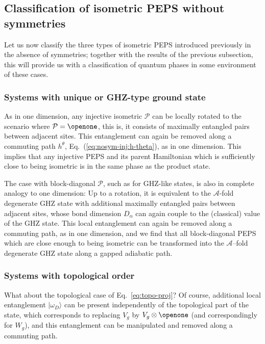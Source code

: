 \documentclass[twocolumn,superscriptaddress,prb,linenumbers]{revtex4-1}
\newcommand{\ket}[1]{\vert#1\rangle}
\newcommand{\mc}[1]{\mathcal{#1}}
\begin{document}
\subsection{Classification of isometric PEPS without symmetries}

Let us now classify the three types of isometric PEPS introduced
previously in the absence of symmetries; together with the results of the
previous subsection, this will provide us with a classification of quantum
phases in some environment of these cases.

\subsubsection{Systems with unique or GHZ-type ground state}



As in one dimension, any injective isometric $\mc P$ can be locally
rotated to the scenario where $\mc P=\openone$, this is, it consists of maximally
entangled pairs between adjacent sites. This entanglement can again be
removed along a commuting path $h^\theta$,
Eq.~(\ref{eq:nosym-inj:h-theta}), as in one dimension.  This implies that
any injective PEPS and its parent Hamiltonian which is sufficiently close
to being isometric is in the same phase as the product state.

The case with block-diagonal $\mc P$, such as for GHZ-like states, is
also in complete analogy to one dimension: Up to a rotation, it is
equivalent to the $\mc A$-fold degenerate GHZ state with additional
maximally entangled pairs between adjacent sites, whose bond dimension
$D_\alpha$ can again couple to the (classical) value of the GHZ state.
This local entanglement can again be removed along a commuting path, as in
one dimension, and we find that all block-diagonal PEPS which are close
enough to being isometric can be transformed into the $\mc A$--fold
degenerate GHZ state along a gapped adiabatic path.



\subsubsection{Systems with topological order}


What about the topological case of Eq.~\eqref{eq:topo-proj}?  Of course,
additional local entanglement $\ket{\omega_D}$ can be present
independently of the topological part of the state, which corresponds to
replacing $V_g$ by $V_g\otimes \openone$ (and correspondingly for $W_g$),
and this entanglement can be manipulated and removed along a commuting
path.
\end{document}
